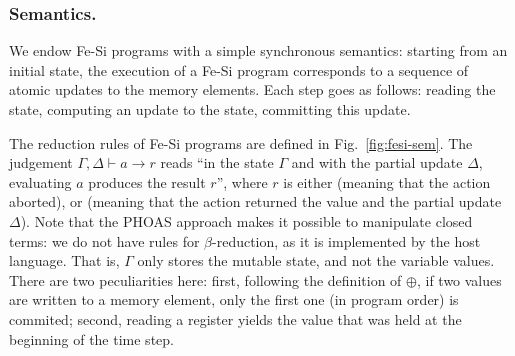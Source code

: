 \documentclass{llncs}
\begin{document}
\subsubsection{Semantics.}
We endow Fe-Si programs with a simple synchronous semantics:  starting
from an initial state, the execution of a Fe-Si program corresponds
to a sequence of atomic updates to the memory elements. 
%
Each step goes as follows: reading the state, computing an update to
the state, committing this update.
%

\begin{figure*}
  \centering
\caption{Dynamic semantics of Fe-Si programs}\label{fig:fesi-sem}
\end{figure*}

The reduction rules of Fe-Si programs are defined in
Fig.~\ref{fig:fesi-sem}. The judgement $\Gamma, \Delta \vdash a \to r$
reads ``in the state $\Gamma$ and with the partial update $\Delta$,
evaluating $a$ produces the result $r$'', where $r$ is either
 (meaning that the action aborted), or %
 (meaning that the action returned the value
 and the partial update $\Delta$). 
%
Note that the PHOAS approach makes it possible to manipulate closed
terms: we do not have rules for $\beta$-reduction, as it is
implemented by the host language.
%
That is, $\Gamma$ only stores the mutable state, and not the variable
values.
%
There are two peculiarities here: first, following the definition of
$\oplus$, if two values are written to a memory element, only the
first one (in program order) is commited; second, reading a register
yields the value that was held at the beginning of the time step. 
\end{document}
